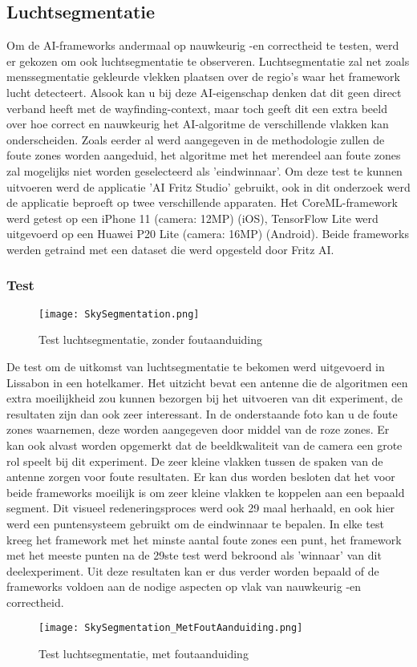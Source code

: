 \subsection{Luchtsegmentatie}
Om de AI-frameworks andermaal op nauwkeurig -en correctheid te testen, werd er gekozen om ook luchtsegmentatie te observeren. Luchtsegmentatie zal net zoals menssegmentatie gekleurde vlekken plaatsen over de regio's waar het framework lucht detecteert. Alsook kan u bij deze AI-eigenschap denken dat dit geen direct verband heeft met de wayfinding-context, maar toch geeft dit een extra beeld over hoe correct en nauwkeurig het AI-algoritme de verschillende vlakken kan onderscheiden. Zoals eerder al werd aangegeven in de methodologie zullen de foute zones worden aangeduid, het algoritme met het merendeel aan foute zones zal mogelijks niet worden geselecteerd als 'eindwinnaar'. Om deze test te kunnen uitvoeren werd de applicatie 'AI Fritz Studio' gebruikt, ook in dit onderzoek werd de applicatie beproeft op twee verschillende apparaten. Het CoreML-framework werd getest op een iPhone 11 (camera: 12MP) (iOS), TensorFlow Lite werd uitgevoerd op een Huawei P20 Lite (camera: 16MP) (Android). Beide frameworks werden getraind met een dataset die werd opgesteld door Fritz AI.

\subsubsection{Test}
\begin{figure}[H]
	\centering
	\texttt{[image: SkySegmentation.png]}
	\caption{Test luchtsegmentatie, zonder foutaanduiding}
\end{figure}
\pagebreak
De test om de uitkomst van luchtsegmentatie te bekomen werd uitgevoerd in Lissabon in een hotelkamer. Het uitzicht bevat een antenne die de algoritmen een extra moeilijkheid zou kunnen bezorgen bij het uitvoeren van dit experiment, de resultaten zijn dan ook zeer interessant. In de onderstaande foto kan u de foute zones waarnemen, deze worden  aangegeven door middel van de roze zones. Er kan ook alvast worden opgemerkt dat de beeldkwaliteit van de camera een grote rol speelt bij dit experiment. De zeer kleine vlakken tussen de spaken van de antenne zorgen voor foute resultaten. Er kan dus worden besloten dat het voor beide frameworks moeilijk is om zeer kleine vlakken te koppelen aan een bepaald segment. Dit visueel redeneringsproces werd ook 29 maal herhaald, en ook hier werd een puntensysteem gebruikt om de eindwinnaar te bepalen. In elke test kreeg het framework met het minste aantal foute zones een punt, het framework met het meeste punten na de 29ste test werd bekroond als 'winnaar' van dit deelexperiment. Uit deze resultaten kan er dus verder worden bepaald of de frameworks voldoen aan de nodige aspecten op vlak van nauwkeurig -en correctheid.
\begin{figure}[H]
	\centering
	\texttt{[image: SkySegmentation\_MetFoutAanduiding.png]}
	\caption{Test luchtsegmentatie, met foutaanduiding}
\end{figure}


